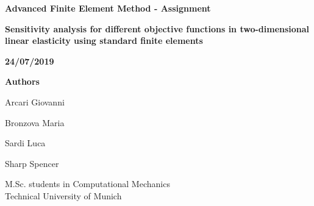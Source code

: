 
\thispagestyle{fancy}
\renewcommand{\headrulewidth}{0pt}
\lhead{}
\chead{}


\begin{center}\Large{\textbf{Advanced Finite Element Method - Assignment}}\\[20pt]\end{center}

\linespread{1.5}

\begin{center}\LARGE{\textbf{Sensitivity analysis for different objective functions in two-dimensional linear elasticity using standard finite elements}}\\[20pt]\end{center}

\vspace{3mm}

\begin{center}\large{\textbf{24/07/2019}}\\[10pt]\end{center}

\vspace{3mm}

\begin{center} \large{\textbf{Authors}}\\[10pt]\end{center}

\begin{center}\large{Arcari Giovanni}\\[10pt]\end{center}
\begin{center}\large{Bronzova Maria}\\[10pt]\end{center}
\begin{center}\large{Sardi Luca}\\[10pt]\end{center}
\begin{center}\large{Sharp Spencer}\\[10pt]\end{center}

\vspace{5mm}
\linespread{1}

\begin{center}\large{M.Sc. students in Computational Mechanics\\
Technical University of Munich}\\[10pt]\end{center}



\newpage